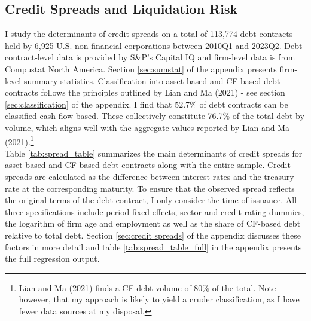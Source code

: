 \documentclass[12pt]{article}
\begin{document}
\subsection{Credit Spreads and Liquidation Risk \label{sec:emp liqrisk}} 

I study the determinants of credit spreads on a total of 113,774 debt contracts held by 6,925 U.S. non-financial corporations between 2010Q1 and 2023Q2. Debt contract-level data is provided by S\&P's Capital IQ and firm-level data is from Compustat North America. Section \ref{sec:sumstat} of the appendix presents firm-level summary statistics. Classification into asset-based and CF-based debt contracts follows the principles outlined by Lian and Ma (2021) - see section \ref{sec:classification} of the appendix. I find that $52.7\%$ of debt contracts can be classified cash flow-based. These collectively constitute 76.7\% of the total debt by volume, which aligns well with the aggregate values reported by Lian and Ma (2021).\footnote{Lian and Ma (2021) finds a CF-debt volume of 80\% of the total. Note however, that my approach is likely to yield a cruder classification, as I have fewer data sources at my disposal.}  \vspace{3mm} \\ 
Table \ref{tab:spread_table} summarizes the main determinants of credit spreads for asset-based and CF-based debt contracts along with the entire sample. Credit spreads are calculated as the difference between interest rates and the treasury rate at the corresponding maturity. To ensure that the observed spread reflects the original terms of the debt contract, I only consider the time of issuance. All three specifications include period fixed effects, sector and credit rating dummies, the logarithm of firm age and employment as well as the share of CF-based debt relative to total debt. Section \ref{sec:credit spreads} of the appendix discusses these factors in more detail and table \ref{tab:spread_table_full} in the appendix presents the full regression output. 
\end{document}
